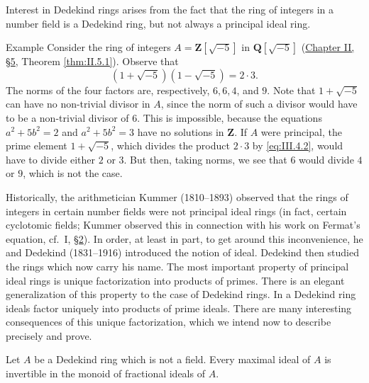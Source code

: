 Interest in Dedekind rings arises from the fact that the ring of integers in
a number field is a Dedekind ring, but not always a principal ideal ring.

\begin{statement}{Example}
Consider the ring of integers $A=\mathbf{Z}[\sqrt{-5}]$ in
$\mathbf{Q}[\sqrt{-5}]$ (\hyperref[sec:2.5]{Chapter II, §5}, Theorem \ref{thm:II.5.1}). Observe
that
\begin{equation}
(1+\sqrt{-5})(1-\sqrt{-5})=2\cdot3.
\label{eq:III.4.2}
\end{equation}
The norms of the four factors are, respectively, $6,6,4$, and $9$. Note that
$1+\sqrt{-5}$ can have no non-trivial divisor in $A$, since the norm of such
a divisor would have to be a non-trivial divisor of $6$. This is impossible,
because the equations $a^{2}+5b^{2}=2$ and $a^{2}+5b^{2}=3$ have no
solutions in $\mathbf{Z}$. If $A$ were principal, the prime element
$1+\sqrt{-5}$, which divides the product $2\cdot3$ by \eqref{eq:III.4.2},
would have to divide either $2$ or $3$. But then, taking norms, we see that
$6$ would divide $4$ or $9$, which is not the case.
\end{statement}

Historically, the arithmetician Kummer (1810--1893) observed that the rings
of integers in certain number fields were not principal ideal rings (in
fact, certain cyclotomic fields; Kummer observed this in connection with his
work on Fermat's equation, cf.\ I, \hyperref[sec:3.2]{§2}). In order, at least in part, to get
around this inconvenience, he and Dedekind (1831--1916) introduced the
notion of ideal. Dedekind then studied the rings which now carry his name.
The most important property of principal ideal rings is unique factorization
into products of primes. There is an elegant generalization of this property
to the case of Dedekind rings. In a Dedekind ring ideals factor uniquely
into products of prime ideals. There are many interesting consequences of
this unique factorization, which we intend now to describe precisely and
prove.

\begin{theorem}
\label{thm:III.4.2}
Let $A$ be a Dedekind ring which is not a field. Every maximal ideal of $A$
is invertible in the monoid of fractional ideals of $A$.
\end{theorem}

